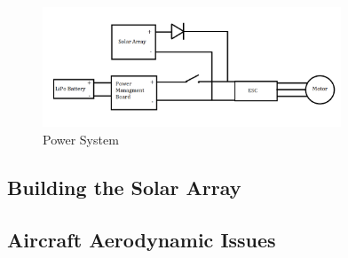 \documentclass[12pt,journal,compsoc]{IEEEtran}
\begin{document}
\begin{figure}[h!]
\hspace*{0cm}
\centering
\includegraphics[width=3.5in]{Solar_Circuit.png}
\caption{Power System}
\label{Solar_Circuit}
\end{figure}

\subsection{Building the Solar Array}

\subsection{Aircraft Aerodynamic Issues}
\end{document}
